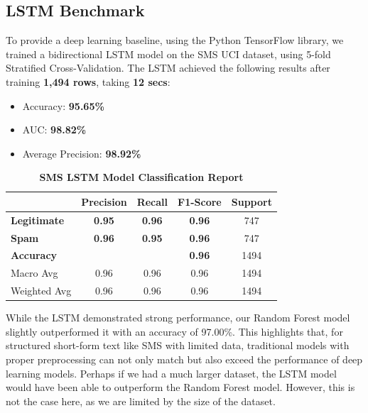 \documentclass{article}
\begin{document}
\subsection{LSTM Benchmark}

\noindent
To provide a deep learning baseline, using the Python TensorFlow library, we trained a bidirectional LSTM model on the SMS UCI dataset, using 5-fold Stratified Cross-Validation. The LSTM achieved the following results after training \textbf{1,494 rows}, taking \textbf{12 secs}:

\begin{itemize}
    \item Accuracy: \textbf{95.65\%}
    \item AUC: \textbf{98.82\%}
    \item Average Precision: \textbf{98.92\%}
\end{itemize}

\begin{table}[htbp]
    \centering
    \caption{\textbf{SMS LSTM Model Classification Report}}
    \begin{tabular}{l c c c c}
    \toprule
     & \textbf{Precision} & \textbf{Recall} & \textbf{F1-Score} & Support \\
    \midrule
    \textbf{Legitimate} & \textbf{0.95} & \textbf{0.96} & \textbf{0.96} & 747 \\
    \textbf{Spam} & \textbf{0.96} & \textbf{0.95} & \textbf{0.96} & 747 \\
    \midrule
    \textbf{Accuracy} & & & \textbf{0.96} & 1494 \\
    Macro Avg & 0.96 & 0.96 & 0.96 & 1494 \\
    Weighted Avg & 0.96 & 0.96 & 0.96 & 1494 \\
    \bottomrule
    \end{tabular}
    \label{tab:classification_report_6}
\end{table}

\noindent
While the LSTM demonstrated strong performance, our Random Forest model slightly outperformed it with an accuracy of 97.00\%. This highlights that, for structured short-form text like SMS with limited data, traditional models with proper preprocessing can not only match but also exceed the performance of deep learning models. Perhaps if we had a much larger dataset, the LSTM model would have been able to outperform the Random Forest model. However, this is not the case here, as we are limited by the size of the dataset.

\end{document}

